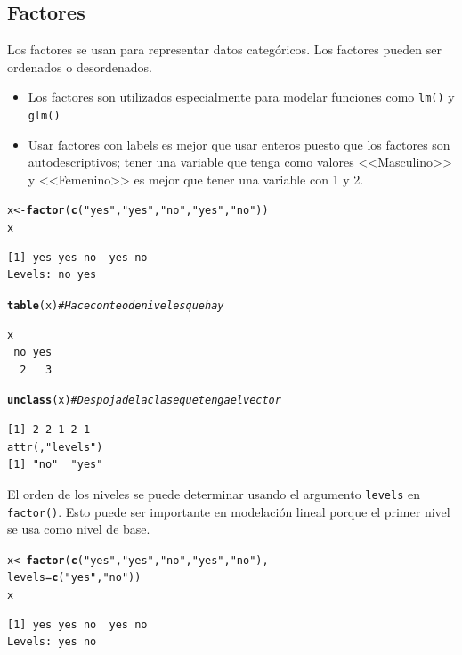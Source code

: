 \documentclass{article}\usepackage[]{graphicx}\usepackage[]{color}
\makeatletter
\newcommand{\hlstr}[1]{\textcolor[rgb]{0.192,0.494,0.8}{#1}}%
\newcommand{\hlcom}[1]{\textcolor[rgb]{0.678,0.584,0.686}{\textit{#1}}}%
\newcommand{\hlstd}[1]{\textcolor[rgb]{0.345,0.345,0.345}{#1}}%
\newcommand{\hlkwb}[1]{\textcolor[rgb]{0.69,0.353,0.396}{#1}}%
\newcommand{\hlkwc}[1]{\textcolor[rgb]{0.333,0.667,0.333}{#1}}%
\newcommand{\hlkwd}[1]{\textcolor[rgb]{0.737,0.353,0.396}{\textbf{#1}}}%
\newenvironment{kframe}{%
 \def\at@end@of@kframe{}%
 \ifinner\ifhmode%
  \def\at@end@of@kframe{\end{minipage}}%
  \begin{minipage}{\columnwidth}%
 \fi\fi%
 \def\FrameCommand##1{\hskip\@totalleftmargin \hskip-\fboxsep
 \colorbox{shadecolor}{##1}\hskip-\fboxsep
     \hskip-\linewidth \hskip-\@totalleftmargin \hskip\columnwidth}%
 \MakeFramed {\advance\hsize-\width
   \@totalleftmargin\z@ \linewidth\hsize
   \@setminipage}}%
 {\par\unskip\endMakeFramed%
 \at@end@of@kframe}
\newenvironment{knitrout}{}{} %
\makeatother
\begin{document}
  \subsection{Factores}
    Los factores se usan para representar datos categóricos. Los factores pueden ser ordenados o desordenados.
      \begin{itemize}
        \item Los factores son utilizados especialmente para modelar funciones como                \texttt{lm()} y \texttt{glm()}
        \item Usar factores con labels es mejor que usar enteros puesto que los factores son autodescriptivos; tener una variable que tenga como valores <<Masculino>> y <<Femenino>> es mejor que tener una variable con 1 y 2.
      \end{itemize}
\begin{knitrout}
\color{fgcolor}\begin{kframe}
\begin{alltt}
  \hlstd{x} \hlkwb{<-} \hlkwd{factor}\hlstd{(}\hlkwd{c}\hlstd{(}\hlstr{"yes"}\hlstd{,} \hlstr{"yes"}\hlstd{,} \hlstr{"no"}\hlstd{,} \hlstr{"yes"}\hlstd{,} \hlstr{"no"}\hlstd{))}
  \hlstd{x}
\end{alltt}
\begin{verbatim}
[1] yes yes no  yes no 
Levels: no yes
\end{verbatim}
\begin{alltt}
  \hlkwd{table}\hlstd{(x)}    \hlcom{# Hace conteo de niveles que hay }
\end{alltt}
\begin{verbatim}
x
 no yes 
  2   3 
\end{verbatim}
\begin{alltt}
  \hlkwd{unclass}\hlstd{(x)}  \hlcom{# Despoja de la clase que tenga el vector}
\end{alltt}
\begin{verbatim}
[1] 2 2 1 2 1
attr(,"levels")
[1] "no"  "yes"
\end{verbatim}
\end{kframe}
\end{knitrout}

    El orden de los niveles se puede determinar usando el argumento \texttt{levels} en \texttt{factor()}. Esto puede ser importante en modelación lineal porque el primer nivel se usa como nivel de base.
\begin{knitrout}
\color{fgcolor}\begin{kframe}
\begin{alltt}
  \hlstd{x} \hlkwb{<-} \hlkwd{factor}\hlstd{(}\hlkwd{c}\hlstd{(}\hlstr{"yes"}\hlstd{,} \hlstr{"yes"}\hlstd{,} \hlstr{"no"}\hlstd{,} \hlstr{"yes"}\hlstd{,} \hlstr{"no"}\hlstd{),}
              \hlkwc{levels} \hlstd{=} \hlkwd{c}\hlstd{(}\hlstr{"yes"}\hlstd{,} \hlstr{"no"}\hlstd{))}
  \hlstd{x}
\end{alltt}
\begin{verbatim}
[1] yes yes no  yes no 
Levels: yes no
\end{verbatim}
\end{kframe}
\end{knitrout}
\end{document}
